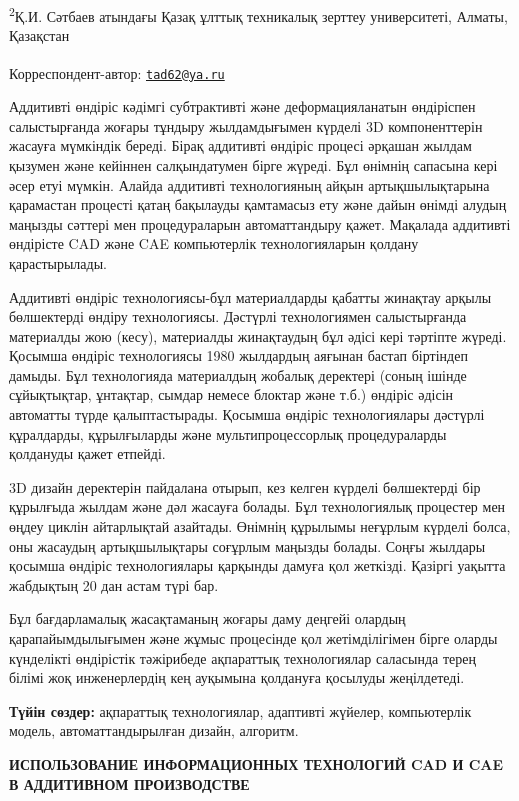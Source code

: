 \textsuperscript{2}Қ.И. Сәтбаев атындағы Қазақ ұлттық техникалық зерттеу
университеті, Алматы, Қазақстан

{\bfseries \textsuperscript{\envelope }}Корреспондент-автор:
\href{mailto:tad62@ya.ru}{\nolinkurl{tad62@ya.ru}}

Аддитивті өндіріс кәдімгі субтрактивті және деформацияланатын өндіріспен
салыстырғанда жоғары тұндыру жылдамдығымен күрделі 3D компоненттерін
жасауға мүмкіндік береді. Бірақ аддитивті өндіріс процесі әрқашан жылдам
қызумен және кейіннен салқындатумен бірге жүреді. Бұл өнімнің сапасына
кері әсер етуі мүмкін. Алайда аддитивті технологияның айқын
артықшылықтарына қарамастан процесті қатаң бақылауды қамтамасыз ету және
дайын өнімді алудың маңызды сәттері мен процедураларын автоматтандыру
қажет. Мақалада аддитивті өндірісте CAD және CAE компьютерлік
технологияларын қолдану қарастырылады.

Аддитивті өндіріс технологиясы-бұл материалдарды қабатты жинақтау арқылы
бөлшектерді өндіру технологиясы. Дәстүрлі технологиямен салыстырғанда
материалды жою (кесу), материалды жинақтаудың бұл әдісі кері тәртіпте
жүреді. Қосымша өндіріс технологиясы 1980 жылдардың аяғынан бастап
біртіндеп дамыды. Бұл технологияда материалдың жобалық деректері (соның
ішінде сұйықтықтар, ұнтақтар, сымдар немесе блоктар және т.б.) өндіріс
әдісін автоматты түрде қалыптастырады. Қосымша өндіріс технологиялары
дәстүрлі құралдарды, құрылғыларды және мультипроцессорлық процедураларды
қолдануды қажет етпейді.

3D дизайн деректерін пайдалана отырып, кез келген күрделі бөлшектерді
бір құрылғыда жылдам және дәл жасауға болады. Бұл технологиялық
процестер мен өңдеу циклін айтарлықтай азайтады. Өнімнің құрылымы
неғұрлым күрделі болса, оны жасаудың артықшылықтары соғұрлым маңызды
болады. Соңғы жылдары қосымша өндіріс технологиялары қарқынды дамуға қол
жеткізді. Қазіргі уақытта жабдықтың 20 дан астам түрі бар.

Бұл бағдарламалық жасақтаманың жоғары даму деңгейі олардың
қарапайымдылығымен және жұмыс процесінде қол жетімділігімен бірге оларды
күнделікті өндірістік тәжірибеде ақпараттық технологиялар саласында
терең білімі жоқ инженерлердің кең ауқымына қолдануға қосылуды
жеңілдетеді.

{\bfseries Түйін сөздер:} ақпараттық технологиялар, адаптивті жүйелер,
компьютерлік модель, автоматтандырылған дизайн, алгоритм.

{\bfseries ИСПОЛЬЗОВАНИЕ ИНФОРМАЦИОННЫХ ТЕХНОЛОГИЙ CAD И CAE В АДДИТИВНОМ
ПРОИЗВОДСТВЕ}

